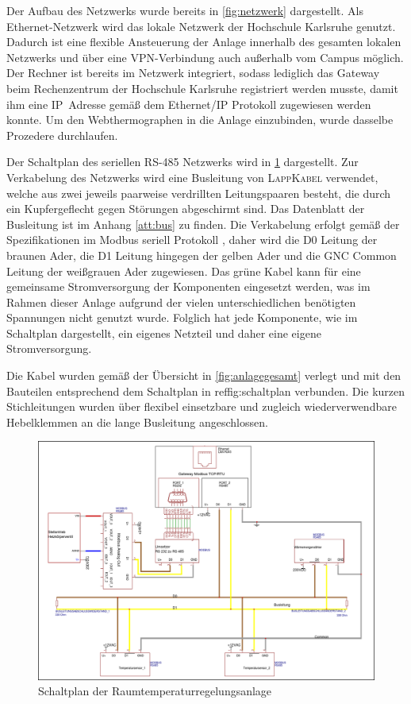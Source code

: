 Der Aufbau des Netzwerks wurde bereits in \ref{fig:netzwerk} dargestellt. Als Ethernet-Netzwerk wird das lokale Netzwerk der Hochschule Karlsruhe genutzt. Dadurch ist eine flexible Ansteuerung der Anlage innerhalb des gesamten lokalen Netzwerks und über eine VPN-Verbindung auch außerhalb vom Campus möglich. Der Rechner ist bereits im Netzwerk integriert, sodass lediglich das Gateway beim Rechenzentrum der Hochschule Karlsruhe registriert werden musste, damit ihm eine IP~Adresse gemäß dem Ethernet/IP Protokoll zugewiesen werden konnte.
Um den Webthermographen in die Anlage einzubinden, wurde dasselbe Prozedere durchlaufen.

Der Schaltplan des seriellen RS-485 Netzwerks wird in \ref{fig:schaltplan} dargestellt. Zur Verkabelung des Netzwerks wird eine Busleitung von \textsc{LappKabel} verwendet, welche aus zwei jeweils paarweise verdrillten Leitungspaaren
besteht, die durch ein Kupfergeflecht gegen Störungen abgeschirmt sind. Das Datenblatt der Busleitung ist im Anhang \ref{att:bus} zu finden.
Die Verkabelung erfolgt gemäß der Spezifikationen im Modbus seriell Protokoll \cite{mod06ser}, daher wird die D0 Leitung der braunen Ader, die D1 Leitung hingegen der gelben Ader und die GNC Common Leitung der weißgrauen Ader zugewiesen. Das grüne Kabel kann für eine gemeinsame Stromversorgung der Komponenten eingesetzt werden, was im Rahmen dieser Anlage aufgrund der vielen unterschiedlichen benötigten Spannungen nicht genutzt wurde. Folglich hat jede Komponente, wie im Schaltplan dargestellt, ein eigenes Netzteil und daher eine eigene Stromversorgung. 

Die Kabel wurden gemäß der Übersicht in \ref{fig:anlagegesamt} verlegt und mit den Bauteilen entsprechend dem Schaltplan in ref{fig:schaltplan} verbunden. Die kurzen Stichleitungen wurden über flexibel einsetzbare und zugleich wiederverwendbare Hebelklemmen an die lange Busleitung angeschlossen.


\begin{figure}
\centering
\includegraphics[width=\textwidth]{abbildungen/20160326_schaltplan}
\caption{Schaltplan der Raumtemperaturregelungsanlage}
\label{fig:schaltplan}
\end{figure}

